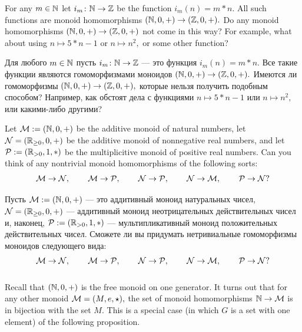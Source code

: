 \documentclass[../main/CT4S-EN-RU]{subfiles}
\begin{document}
\begin{exerciseENG}
For any $m\in{\mathbb N}$ let $i_m\colon{\mathbb N}\rightarrow{\mathbb Z}$ be the function $i_m(n)=m*n.$ All such functions are monoid homomorphisms $({\mathbb N},0,+)\rightarrow({\mathbb Z},0,+).$ Do any monoid homomorphisms $({\mathbb N},0,+)\rightarrow({\mathbb Z},0,+)$ not come in this way? For example, what about using $n\mapsto 5*n-1$ or $n\mapsto n^2,$ or some other function?
\end{exerciseENG}

\begin{exerciseRUS}
Для любого $m\in{\mathbb N}$ пусть $i_m\colon{\mathbb N}\rightarrow{\mathbb Z}$ — это функция $i_m(n)=m*n.$ Все такие функции являются гомоморфизмами моноидов $({\mathbb N},0,+)\rightarrow({\mathbb Z},0,+).$ Имеются ли гомоморфизмы $({\mathbb N},0,+)\rightarrow({\mathbb Z},0,+),$ которые нельзя получить подобным способом? Например, как обстоят дела с функциями $n\mapsto 5*n-1$ или $n\mapsto n^2,$ или какими-либо другими?%
\end{exerciseRUS}

\begin{exerciseENG}
Let $\mathcal{M}:=({\mathbb N},0,+)$ be the additive monoid of natural numbers, let $\mathcal{N}=({\mathbb R}_{\geq0},0,+)$ be the additive monoid of nonnegative real numbers, and let $\mathcal{P}:=({\mathbb R}_{>0},1,*)$ be the multiplicitive monoid of positive real numbers. Can you think of any nontrivial monoid homomorphisms of the following sorts: $$\mathcal{M}\rightarrow\mathcal{N},\hspace{.3in}\mathcal{M}\rightarrow\mathcal{P},\hspace{.3in}\mathcal{N}\rightarrow\mathcal{P},\hspace{.3in} \mathcal{N}\rightarrow\mathcal{M},\hspace{.3in}\mathcal{P}\rightarrow\mathcal{N}?$$
\end{exerciseENG}

\begin{exerciseRUS}
Пусть $\mathcal{M}:=({\mathbb N},0,+)$ — это аддитивный моноид натуральных чисел, $\mathcal{N}=({\mathbb R}_{\geq0},0,+)$ — аддитивный моноид неотрицательных действительных чисел и, наконец, $\mathcal{P}:=({\mathbb R}_{>0},1,*)$ — мультипликативный моноид положительных действительных чисел.%
Сможете ли вы придумать нетривиальные гомоморфизмы моноидов следующего вида: $$\mathcal{M}\rightarrow\mathcal{N},\hspace{.3in}\mathcal{M}\rightarrow\mathcal{P},\hspace{.3in}\mathcal{N}\rightarrow\mathcal{P},\hspace{.3in} \mathcal{N}\rightarrow\mathcal{M},\hspace{.3in}\mathcal{P}\rightarrow\mathcal{N}?$$
\end{exerciseRUS}


\subsubsection{}

\begin{blockENG}
Recall that $({\mathbb N},0,+)$ is the free monoid on one generator. It turns out that for any other monoid $\mathcal{M}=(M,e,\star),$ the set of monoid homomorphisms ${\mathbb N}\rightarrow\mathcal{M}$ is in bijection with the set $M.$ This is a special case (in which $G$ is a set with one element) of the following proposition.
\end{blockENG}
\end{document}
